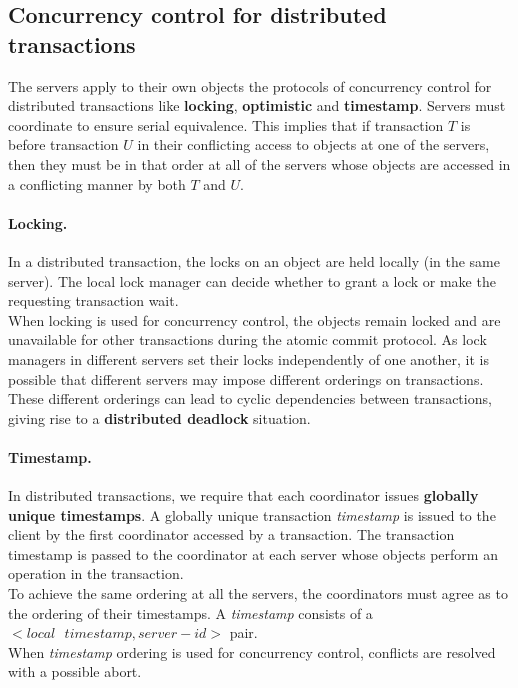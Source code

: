 \subsection{Concurrency control for distributed transactions}
The servers apply to their own objects the protocols of concurrency control for
distributed transactions like \textbf{locking}, \textbf{optimistic} and \textbf{timestamp}. Servers must coordinate to ensure serial equivalence. This implies that if transaction $T$ is before transaction $U$ in their conflicting access to objects at one of the servers, then they must be in that order at all of the servers whose objects are accessed in a conflicting manner by both $T$ and $U$.

\paragraph*{Locking.} In a distributed transaction, the locks on an object are held locally (in the same server). The local lock manager can decide whether to grant a lock or make the requesting transaction wait.\\
When locking is used for concurrency control, the objects remain locked and are unavailable for other transactions during the atomic commit protocol. As lock managers in different servers set their locks independently of one another, it is possible that different servers may impose different orderings on transactions. These different orderings can lead to cyclic dependencies between transactions, giving rise to a \textbf{distributed deadlock} situation.

\paragraph*{Timestamp.} In distributed transactions, we require that each coordinator issues \textbf{globally unique timestamps}. A globally unique transaction \textit{timestamp} is issued to the client by the first coordinator accessed by a transaction. The transaction timestamp is passed to the coordinator at each server whose objects perform an operation in the transaction.\\
To achieve the same ordering at all the servers, the coordinators must agree as to the ordering of their timestamps. A \textit{timestamp} consists of a $<local\text{ }timestamp, server-id>$ pair. \\
When \textit{timestamp} ordering is used for concurrency control, conflicts are resolved with a possible abort.

